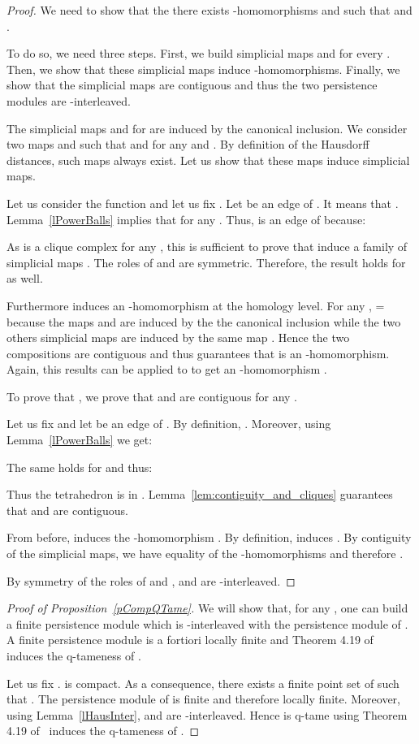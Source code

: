 \documentclass[a4paper]{article}
\begin{document}
\begin{proof}
We need to show that the there exists -homomorphisms  and  such that  and .

To do so, we need three steps.
First, we build simplicial maps  and  for every .
Then, we show that these simplicial maps induce -homomorphisms.
Finally, we show that the simplicial maps are contiguous and thus the two persistence modules are -interleaved.



The simplicial maps  and  for  are induced by the canonical inclusion. 
We consider two maps  and  such that  and  for any  and .
By definition of the Hausdorff distances, such maps always exist.
Let us show that these maps induce simplicial maps.

Let us consider the function  and let us fix .
Let  be an edge of . 
It means that .
Lemma~\ref{lPowerBalls} implies that  for any .
Thus,  is an edge of  because:


As  is a clique complex for any , this is sufficient to prove that  induce a family of simplicial maps .
The roles of  and  are symmetric.
Therefore, the result holds for  as well.





Furthermore  induces an -homomorphism  at the homology level. 
For any , = because the maps  and  are induced by the the canonical inclusion while the two others simplicial maps are induced by the same map .
Hence the two compositions are contiguous and thus guarantees that  is an -homomorphism. 
Again, this results can be applied to  to get an -homomorphism .

To prove that , we prove that  and  are contiguous for any .

Let us fix  and let  be an edge of .
By definition, .
Moreover, using Lemma~\ref{lPowerBalls} we get:

The same holds for  and thus:

Thus the tetrahedron  is in .
Lemma~\ref{lem:contiguity_and_cliques} guarantees that  and  are contiguous.

From before,  induces the -homomorphism .
By definition,  induces .
By contiguity of the simplicial maps, we have equality of the -homomorphisms and therefore .

By symmetry of the roles of  and ,  and  are -interleaved.
\end{proof}

\begin{proof}[Proof of Proposition~\ref{pCompQTame}]
We will show that, for any , one can build a finite persistence module which is -interleaved with the persistence module of .
A finite persistence module is a fortiori locally finite and Theorem 4.19 of~\cite{sspmCDGO} induces the q-tameness of .

Let us fix .
 is compact.
As a consequence, there exists a finite point set  of  such that .
The persistence module of  is finite and therefore locally finite.
Moreover, using Lemma~\ref{lHausInter},  and  are -interleaved.
Hence  is q-tame using Theorem 4.19 of~\cite{sspmCDGO} induces the q-tameness of .
\end{proof}
\end{document}
